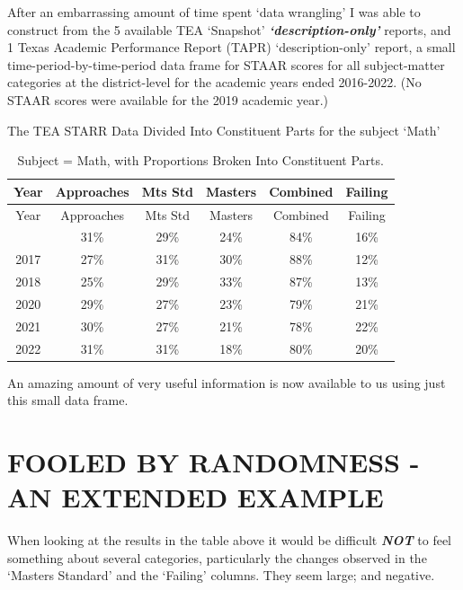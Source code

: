 \documentclass[
  letterpaper,
  DIV=11,
  numbers=noendperiod]{scrartcl}
\begin{document}
After an embarrassing amount of time spent `data wrangling' I was able
to construct from the 5 available TEA `Snapshot'
\textbf{\emph{`description-only'}} reports, and 1 Texas Academic
Performance Report (TAPR) `description-only' report, a small
time-period-by-time-period data frame for STAAR scores for all
subject-matter categories at the district-level for the academic years
ended 2016-2022. (No STAAR scores were available for the 2019 academic
year.)

\vspace{1.0in}

The TEA STARR Data Divided Into Constituent Parts for the subject `Math'

\begin{longtable}[]{@{}cccccc@{}}
\caption{Subject = Math, with Proportions Broken Into Constituent
Parts.}\tabularnewline
\toprule\noalign{}
Year & Approaches & Mts Std & Masters & Combined & Failing \\
\midrule\noalign{}
\endfirsthead
\toprule\noalign{}
Year & Approaches & Mts Std & Masters & Combined & Failing \\
\midrule\noalign{}
\endhead
\bottomrule\noalign{}
\endlastfoot
2016 & 31\% & 29\% & 24\% & 84\% & 16\% \\
2017 & 27\% & 31\% & 30\% & 88\% & 12\% \\
2018 & 25\% & 29\% & 33\% & 87\% & 13\% \\
2020 & 29\% & 27\% & 23\% & 79\% & 21\% \\
2021 & 30\% & 27\% & 21\% & 78\% & 22\% \\
2022 & 31\% & 31\% & 18\% & 80\% & 20\% \\
\end{longtable}

An amazing amount of very useful information is now available to us
using just this small data frame.

\vspace{0.3in}

\section{\texorpdfstring{\textbf{FOOLED BY RANDOMNESS - AN EXTENDED
EXAMPLE}}{FOOLED BY RANDOMNESS - AN EXTENDED EXAMPLE}}\label{fooled-by-randomness---an-extended-example}

When looking at the results in the table above it would be difficult
\textbf{\emph{NOT}} to feel something about several categories,
particularly the changes observed in the `Masters Standard' and the
`Failing' columns. They seem large; and negative.
\end{document}

